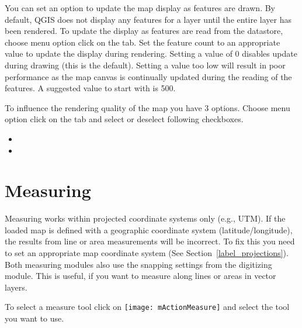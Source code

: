 \label{label_updatemap}

You can set an option to update the map display as features are drawn. By
default, QGIS does not display any features for a layer until the entire
layer has been rendered. To update the display as features are read from the
datastore, choose menu option  \arrow {}
click on the  tab. Set the feature count to an
appropriate value to update the display during rendering. Setting a value of 0
disables update during drawing (this is the default). Setting a value too low
will result in poor performance as the map canvas is continually updated
during the reading of the features. A suggested value to start with is 500.

\label{label_renderquality}

To influence the rendering quality of the map you have 3 options. Choose menu
option  \arrow {} click on the
 tab and select or deselect following checkboxes.

\begin{itemize}
\item {}
\item {}
\end{itemize}

\section{Measuring}\label{sec:measure}

Measuring works within projected coordinate systems only (e.g., UTM). If
the loaded map is defined with a geographic coordinate system
(latitude/longitude), the results from line or area measurements will be
incorrect. To fix this you need to set an appropriate map coordinate system
(See Section~\ref{label_projections}). Both measuring modules also use the
snapping settings from the digitizing module. This is useful, if you want to
measure along lines or areas in vector layers.

To select a measure tool click on \texttt{[image: mActionMeasure]} and 
select the tool you want to use.

